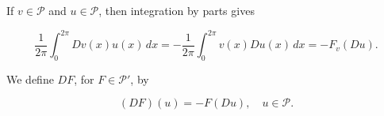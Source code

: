 If $v \in \mathcal{P}$ and $u \in \mathcal{P}$, then integration by parts gives

$$\frac{1}{2\pi} \int_0^{2\pi} Dv(x) u(x) \, dx = -\frac{1}{2\pi} \int_0^{2\pi} v(x) Du(x) \, dx = -F_v(Du).$$

We define $DF$, for $F \in \mathcal{P}'$, by

$$(DF)(u) = -F(Du), \quad u \in \mathcal{P}.$$
